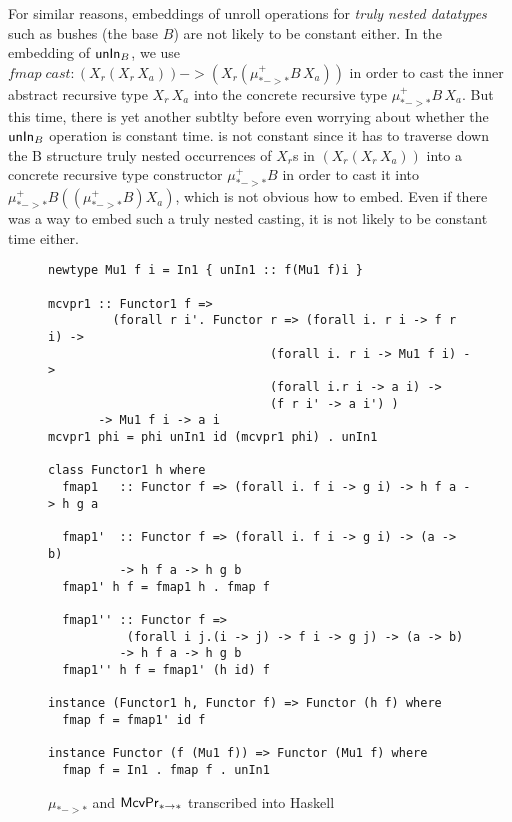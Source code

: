 For similar reasons, embeddings of unroll operations for
\emph{truly nested datatypes} such as bushes (the base $B$) are not likely
to be constant either. In the embedding of $\mathsf{unIn}_B$, we use
$\textit{fmap}\;\textit{cast}: (X_r(X_r\,X_a)) -> (X_r(\mu^{+}_{* -> *}B\,X_a))$
in order to cast the inner abstract recursive type $X_r\,X_a$ into
the concrete recursive type $\mu^{+}_{* -> *}B\,X_a$. But this time, there is
yet another subtlty before even worrying about whether the $\mathsf{unIn}_B$
operation is constant time.
is not constant since it has to traverse down the B structure
truly nested occurrences of $X_r$s in $(X_r(X_r\,X_a))$ into
a concrete recursive type constructor $\mu^{+}_{* -> *} B$ in order
to cast it into $\mu^{+}_{* -> *} B((\mu^{+}_{* -> *} B)X_a)$, which
is not obvious how to embed. Even if there was a way to embed such
a truly nested casting, it is not likely to be constant time either.


\begin{figure}
\begin{singlespace}
\begin{lstlisting}
newtype Mu1 f i = In1 { unIn1 :: f(Mu1 f)i }

mcvpr1 :: Functor1 f =>
         (forall r i'. Functor r => (forall i. r i -> f r i) ->
                               (forall i. r i -> Mu1 f i) ->
                               (forall i.r i -> a i) ->
                               (f r i' -> a i') )
       -> Mu1 f i -> a i
mcvpr1 phi = phi unIn1 id (mcvpr1 phi) . unIn1

class Functor1 h where
  fmap1   :: Functor f => (forall i. f i -> g i) -> h f a -> h g a

  fmap1'  :: Functor f => (forall i. f i -> g i) -> (a -> b)
          -> h f a -> h g b
  fmap1' h f = fmap1 h . fmap f

  fmap1'' :: Functor f =>
           (forall i j.(i -> j) -> f i -> g j) -> (a -> b)
          -> h f a -> h g b
  fmap1'' h f = fmap1' (h id) f

instance (Functor1 h, Functor f) => Functor (h f) where
  fmap f = fmap1' id f

instance Functor (f (Mu1 f)) => Functor (Mu1 f) where
  fmap f = In1 . fmap f . unIn1
\end{lstlisting}
\end{singlespace}
\caption{$\mu_{* -> *}$ and $\mathsf{McvPr}_{* -> *}$ transcribed into Haskell}
\label{fig:HaskellFunctor1}
\end{figure}


